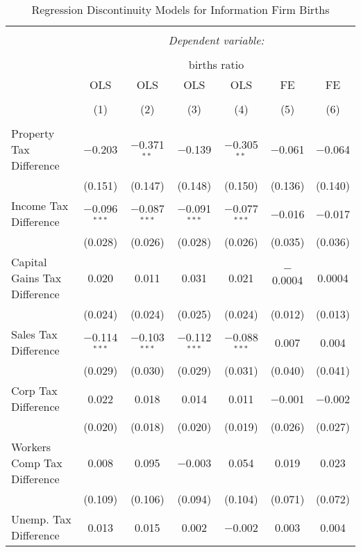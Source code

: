 
\begin{table}[!htbp] \centering 
  \caption{Regression Discontinuity Models for  Information Firm Births} 
  \label{51rd} 
\begin{tabular}{@{\extracolsep{5pt}}lcccccc} 
\\[-1.8ex]\hline 
\hline \\[-1.8ex] 
 & \multicolumn{6}{c}{\textit{Dependent variable:}} \\ 
\cline{2-7} 
\\[-1.8ex] & \multicolumn{6}{c}{births ratio} \\ 
 & OLS & OLS & OLS & OLS & FE & FE \\ 
\\[-1.8ex] & (1) & (2) & (3) & (4) & (5) & (6)\\ 
\hline \\[-1.8ex] 
 Property Tax Difference & $-$0.203 & $-$0.371$^{**}$ & $-$0.139 & $-$0.305$^{**}$ & $-$0.061 & $-$0.064 \\ 
  & (0.151) & (0.147) & (0.148) & (0.150) & (0.136) & (0.140) \\ 
  Income Tax Difference & $-$0.096$^{***}$ & $-$0.087$^{***}$ & $-$0.091$^{***}$ & $-$0.077$^{***}$ & $-$0.016 & $-$0.017 \\ 
  & (0.028) & (0.026) & (0.028) & (0.026) & (0.035) & (0.036) \\ 
  Capital Gains Tax Difference & 0.020 & 0.011 & 0.031 & 0.021 & $-$0.0004 & 0.0004 \\ 
  & (0.024) & (0.024) & (0.025) & (0.024) & (0.012) & (0.013) \\ 
  Sales Tax Difference & $-$0.114$^{***}$ & $-$0.103$^{***}$ & $-$0.112$^{***}$ & $-$0.088$^{***}$ & 0.007 & 0.004 \\ 
  & (0.029) & (0.030) & (0.029) & (0.031) & (0.040) & (0.041) \\ 
  Corp Tax Difference & 0.022 & 0.018 & 0.014 & 0.011 & $-$0.001 & $-$0.002 \\ 
  & (0.020) & (0.018) & (0.020) & (0.019) & (0.026) & (0.027) \\ 
  Workers Comp Tax Difference & 0.008 & 0.095 & $-$0.003 & 0.054 & 0.019 & 0.023 \\ 
  & (0.109) & (0.106) & (0.094) & (0.104) & (0.071) & (0.072) \\ 
  Unemp. Tax Difference & 0.013 & 0.015 & 0.002 & $-$0.002 & 0.003 & 0.004 \\ 

\end{tabular}
\end{table}
